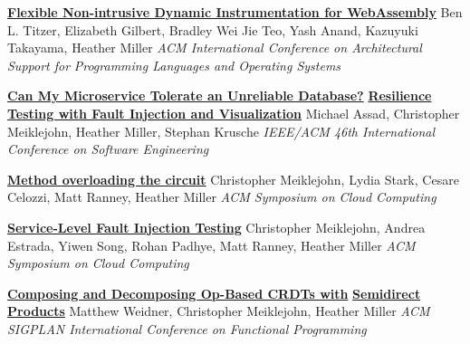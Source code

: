 \documentclass[9pt]{article}
\begin{document}
\noindent\href{https://dl.acm.org/doi/10.1145/3620666.3651338}{\bf Flexible Non-intrusive Dynamic Instrumentation for WebAssembly}
\newline\noindent Ben L. Titzer, Elizabeth Gilbert, Bradley Wei Jie Teo, Yash Anand,\vspace{-0.03in}
\newline\noindent Kazuyuki Takayama, Heather Miller
\newline\noindent\emph{ACM International Conference on Architectural Support for}\vspace{-0.03in} 
\newline\noindent\emph{Programming Languages and Operating Systems}
\bigskip

\noindent\href{https://dl.acm.org/doi/10.1145/3639478.3640021}{\bf Can My Microservice Tolerate an Unreliable Database?}\vspace{-0.03in}
\newline\noindent\href{https://dl.acm.org/doi/10.1145/3639478.3640021}{\bf Resilience Testing with Fault Injection and Visualization}
\newline\noindent Michael Assad, Christopher Meiklejohn, Heather Miller, Stephan Krusche
\newline\noindent\emph{IEEE/ACM 46th International Conference on Software Engineering}
\bigskip

\noindent\href{https://dl.acm.org/doi/10.1145/3542929.3563466}{\bf Method overloading the circuit}
\newline\noindent Christopher Meiklejohn, Lydia Stark, Cesare Celozzi, Matt Ranney, Heather Miller
\newline\noindent\emph{ACM Symposium on Cloud Computing}
\bigskip

\noindent\href{https://dl.acm.org/doi/10.1145/3472883.3487005}{\bf Service-Level Fault Injection Testing}
\newline\noindent Christopher Meiklejohn, Andrea Estrada, Yiwen Song, Rohan Padhye, Matt Ranney, Heather Miller
\newline\noindent\emph{ACM Symposium on Cloud Computing}
\bigskip

\noindent\href{https://arxiv.org/abs/2004.04303}{\bf Composing and Decomposing Op-Based CRDTs with}\vspace{-0.03in}
\newline\noindent\href{https://arxiv.org/abs/2004.04303}{\bf Semidirect Products}
\newline\noindent Matthew Weidner, Christopher Meiklejohn, Heather Miller
\newline\noindent\emph{ACM SIGPLAN International Conference on Functional Programming}
\bigskip
\end{document}
